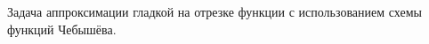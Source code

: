 \documentclass[__main__.tex]{subfiles}
\begin{document}
Задача аппроксимации гладкой на отрезке функции с использованием схемы функций Чебышёва.\\
\end{document}
